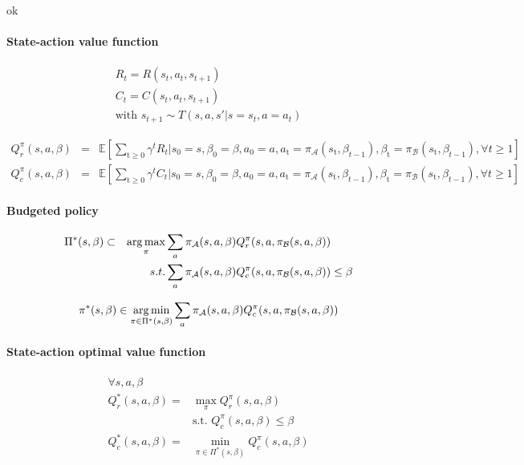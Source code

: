 \documentclass{article}
\begin{document}
ok
\newpage
\paragraph{State-action value function}

\begin{align}
R_t = R(s_t,a_t,s_{t+1})\\
C_t = C(s_t,a_t,s_{t+1})\\
\text{with } s_{t+1} \sim T(s,a,s' |s=s_{t},a=a_{t})
\end{align}

\begin{align}
Q^{\pi}_r(s, a,\beta)&=&\mathbb{E}\left[\sum_{\mathrm{t} \geq 0} \gamma^{t} R_t | s_{0}=s,\beta_0=\beta, a_{0}=a, a_{\mathrm{t}}=\pi_{\mathcal{A}}\left(s_{\mathrm{t}},\beta_{t-1}\right), \beta_{\mathrm{t}}=\pi_{\mathcal{B}}\left(s_{\mathrm{t}},\beta_{t-1}\right),\forall t \geq 1\right]\\
Q^{\pi}_c(s, a,\beta)&=&\mathbb{E}\left[\sum_{\mathrm{t} \geq 0} \gamma^{t} C_t | s_{0}=s,\beta_0=\beta, a_{0}=a, a_{\mathrm{t}}=\pi_{\mathcal{A}}\left(s_{\mathrm{t}},\beta_{t-1}\right), \beta_{\mathrm{t}}=\pi_{\mathcal{B}}\left(s_{\mathrm{t}},\beta_{t-1}\right),\forall t \geq 1\right]
\end{align}


\paragraph{Budgeted policy}

\begin{align}
\Pi^*(s,\beta)& \subset&\operatorname*{arg\,max}\limits_{\pi} &\sum\limits_{a} \pi_\mathcal{A} (s,a,\beta) Q_r^\pi(s,a,\pi_\mathcal{B} (s,a,\beta))\label{eq:optimal-policy}\\
& &s. t. &\sum\limits_{a} \pi_\mathcal{A} (s,a,\beta) Q_c^\pi(s,a,\pi_\mathcal{B} (s,a,\beta)) \leq \beta
\end{align}


\begin{align}
\pi^*(s,\beta)  \in \operatorname*{arg\,min}\limits_{\pi\in\Pi^*(s,\beta)} \sum\limits_{a} \pi_\mathcal{A} (s,a,\beta) Q_c^\pi(s,a,\pi_\mathcal{B} (s,a,\beta))
\end{align}

\paragraph{State-action optimal value function}
\begin{align}
\forall s,a,\beta\\
Q^*_r(s,a,\beta) = &\max\limits_{\pi } Q^\pi_r(s,a,\beta)\\
&\text{s.t. } Q^\pi_c(s,a,\beta) \leq \beta\\
Q^*_c(s,a,\beta) = &\min\limits_{\pi\in\Pi^*(s,\beta)} Q_c^\pi(s,a,\beta)
\end{align}
\end{document}
